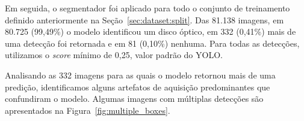 \documentclass[12pt]{article}
\begin{document}
Em seguida, o segmentador foi aplicado para todo o conjunto de treinamento definido anteriormente na Seção~\ref{sec:dataset:split}. Das 81.138 imagens, em 80.725 (99,49\%) o modelo identificou um disco óptico, em 332 (0,41\%) mais de uma detecção foi retornada e em 81 (0,10\%) nenhuma. Para todas as detecções, utilizamos o \emph{score} mínimo de 0,25, valor padrão do YOLO.

Analisando as 332 imagens para as quais o modelo retornou mais de uma predição, identificamos alguns artefatos de aquisição predominantes que confundiram o modelo. Algumas imagens com múltiplas detecções são apresentados na Figura~\ref{fig:multiple_boxes}.
\end{document}
